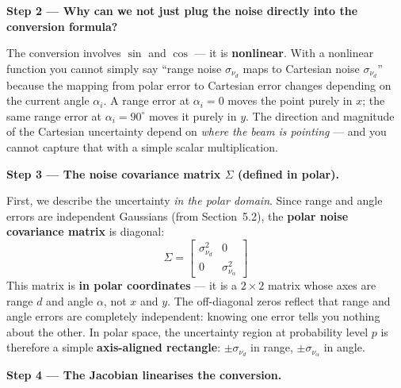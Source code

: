 \documentclass[12pt, a4paper]{article}
\begin{document}
\textbf{Step 2 --- Why can we not just plug the noise directly into the
conversion formula?}

The conversion involves $\sin$ and $\cos$ --- it is \textbf{nonlinear}.
With a nonlinear function you cannot simply say ``range noise
$\sigma_{\nu_d}$ maps to Cartesian noise $\sigma_{\nu_d}$'' because the
mapping from polar error to Cartesian error changes depending on the
current angle $\alpha_i$.
A range error at $\alpha_i = 0$ moves the point purely in $x$; the same
range error at $\alpha_i = 90^\circ$ moves it purely in $y$.
The direction and magnitude of the Cartesian uncertainty depend on
\emph{where the beam is pointing} --- and you cannot capture that with a
simple scalar multiplication.

\textbf{Step 3 --- The noise covariance matrix $\Sigma$ (defined in polar).}

First, we describe the uncertainty \emph{in the polar domain}.
Since range and angle errors are independent Gaussians (from Section~5.2),
the \textbf{polar noise covariance matrix} is diagonal:
\[
  \Sigma
  = \begin{bmatrix} \sigma_{\nu_d}^2 & 0 \\
                    0 & \sigma_{\nu_\alpha}^2 \end{bmatrix}
\]
This matrix is \textbf{in polar coordinates} --- it is a $2\times2$ matrix
whose axes are range $d$ and angle $\alpha$, not $x$ and $y$.
The off-diagonal zeros reflect that range and angle errors are completely
independent: knowing one error tells you nothing about the other.
In polar space, the uncertainty region at probability level $p$ is therefore
a simple \textbf{axis-aligned rectangle}: $\pm\sigma_{\nu_d}$ in range,
$\pm\sigma_{\nu_\alpha}$ in angle.

\textbf{Step 4 --- The Jacobian linearises the conversion.}
\end{document}
